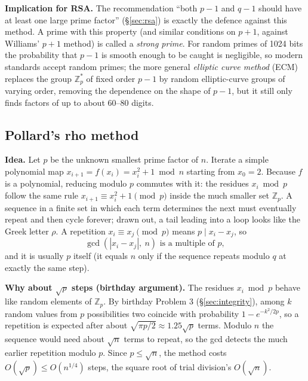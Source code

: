\textbf{Implication for RSA.} The recommendation ``both $p - 1$ and $q - 1$ should have at least one large prime factor'' (\S\ref{sec:rsa}) is exactly the defence against this method. A prime with this property (and similar conditions on $p + 1$, against Williams' $p + 1$ method) is called a \emph{strong prime}. For random primes of 1024 bits the probability that $p - 1$ is smooth enough to be caught is negligible, so modern standards accept random primes; the more general \emph{elliptic curve method} (ECM) replaces the group $\mathbb{Z}_p^*$ of fixed order $p - 1$ by random elliptic-curve groups of varying order, removing the dependence on the shape of $p - 1$, but it still only finds factors of up to about 60--80 digits.

\subsection{Pollard's rho method \hot\new}

\textbf{Idea.} Let $p$ be the unknown smallest prime factor of $n$. Iterate a simple polynomial map $x_{i+1} = f(x_i) = x_i^2 + 1 \bmod n$ starting from $x_0 = 2$. Because $f$ is a polynomial, reducing modulo $p$ commutes with it: the residues $x_i \bmod p$ follow the same rule $x_{i+1} \equiv x_i^2 + 1 \pmod p$ inside the much smaller set $\mathbb{Z}_p$. A sequence in a finite set in which each term determines the next must eventually repeat and then cycle forever; drawn out, a tail leading into a loop looks like the Greek letter $\rho$. A repetition $x_i \equiv x_j \pmod p$ means $p \mid x_i - x_j$, so
\[
\gcd(|x_i - x_j|,\ n) \text{ is a multiple of } p,
\]
and it is usually $p$ itself (it equals $n$ only if the sequence repeats modulo $q$ at exactly the same step).

\textbf{Why about $\sqrt p$ steps (birthday argument).} The residues $x_i \bmod p$ behave like random elements of $\mathbb{Z}_p$. By birthday Problem 3 (\S\ref{sec:integrity}), among $k$ random values from $p$ possibilities two coincide with probability $1 - e^{-k^2/2p}$, so a repetition is expected after about $\sqrt{\pi p/2} \approx 1.25\sqrt p$ terms. Modulo $n$ the sequence would need about $\sqrt n$ terms to repeat, so the gcd detects the much earlier repetition modulo $p$. Since $p \le \sqrt n$, the method costs $O(\sqrt p) \le O(n^{1/4})$ steps, the square root of trial division's $O(\sqrt n)$.

